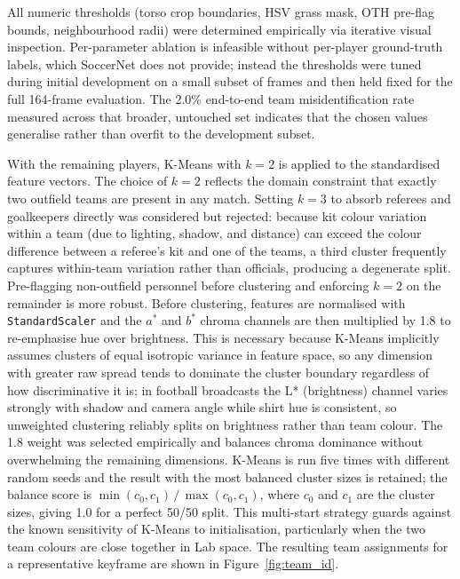 All numeric thresholds (torso crop boundaries, HSV grass mask, OTH pre-flag bounds, neighbourhood radii) were determined empirically via iterative visual inspection. Per-parameter ablation is infeasible without per-player ground-truth labels, which SoccerNet does not provide; instead the thresholds were tuned during initial development on a small subset of frames and then held fixed for the full 164-frame evaluation. The 2.0\% end-to-end team misidentification rate measured across that broader, untouched set indicates that the chosen values generalise rather than overfit to the development subset.

With the remaining players, K-Means with $k=2$ is applied to the standardised feature vectors. The choice of $k=2$ reflects the domain constraint that exactly two outfield teams are present in any match. Setting $k=3$ to absorb referees and goalkeepers directly was considered but rejected: because kit colour variation within a team (due to lighting, shadow, and distance) can exceed the colour difference between a referee's kit and one of the teams, a third cluster frequently captures within-team variation rather than officials, producing a degenerate split. Pre-flagging non-outfield personnel before clustering and enforcing $k=2$ on the remainder is more robust. Before clustering, features are normalised with \texttt{StandardScaler} and the $a^*$ and $b^*$ chroma channels are then multiplied by 1.8 to re-emphasise hue over brightness. This is necessary because K-Means implicitly assumes clusters of equal isotropic variance in feature space, so any dimension with greater raw spread tends to dominate the cluster boundary regardless of how discriminative it is; in football broadcasts the L* (brightness) channel varies strongly with shadow and camera angle while shirt hue is consistent, so unweighted clustering reliably splits on brightness rather than team colour. The 1.8 weight was selected empirically and balances chroma dominance without overwhelming the remaining dimensions. K-Means is run five times with different random seeds and the result with the most balanced cluster sizes is retained; the balance score is $\min(c_0, c_1)\,/\,\max(c_0, c_1)$, where $c_0$ and $c_1$ are the cluster sizes, giving 1.0 for a perfect 50/50 split. This multi-start strategy guards against the known sensitivity of K-Means to initialisation, particularly when the two team colours are close together in Lab space. The resulting team assignments for a representative keyframe are shown in Figure~\ref{fig:team_id}.

